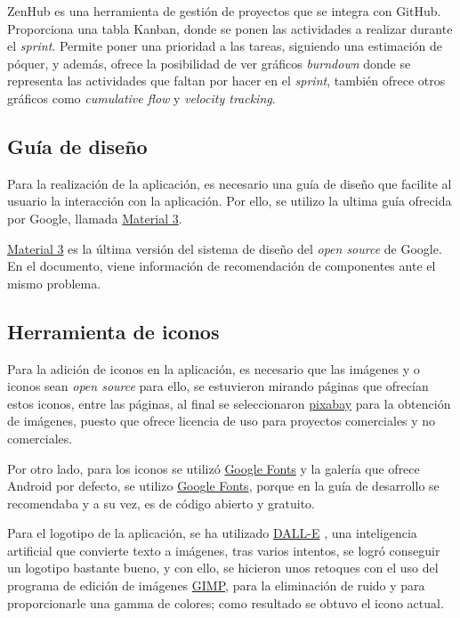         ZenHub es una herramienta de gestión de proyectos que se integra con GitHub. Proporciona una tabla Kanban, donde se ponen las actividades a realizar durante el \textit{sprint}. Permite poner una prioridad a las tareas, siguiendo una estimación de póquer, y además, ofrece la posibilidad de ver gráficos \textit{burndown} donde se representa las actividades que faltan por hacer en el \textit{sprint}, también ofrece otros gráficos como \textit{cumulative flow} y \textit{velocity tracking}.

    \subsection{Guía de diseño}
        Para la realización de la aplicación, es necesario una guía de diseño que facilite al usuario la interacción con la aplicación. Por ello, se utilizo la ultima guía ofrecida por Google, llamada \href{https://m3.material.io/}{Material 3}.

        \href{https://m3.material.io/}{Material 3} es la última versión del sistema de diseño del \textit{open source} de Google.
        En el documento, viene información de recomendación de componentes ante el mismo problema.

    \subsection{Herramienta de iconos}
        Para la adición de iconos en la aplicación, es necesario que las imágenes y o iconos sean \textit{open source} para ello, se estuvieron mirando páginas que ofrecían estos iconos, entre las páginas, al final se seleccionaron \href{https://pixabay.com/es/}{pixabay} para la obtención de imágenes, puesto que ofrece licencia de uso para proyectos comerciales y no comerciales.

        Por otro lado, para los iconos se utilizó \href{https://fonts.google.com/icons}{Google Fonts} y la galería que ofrece Android por defecto, se utilizo \href{https://fonts.google.com/icons}{Google Fonts}, porque en la guía de desarrollo se recomendaba y a su vez, es de código abierto y gratuito.

        Para el logotipo de la aplicación, se ha utilizado \href{https://labs.openai.com/}{DALL-E} , una inteligencia artificial que convierte texto a imágenes, tras varios intentos, se logró conseguir un logotipo bastante bueno, y con ello, se hicieron unos retoques con el uso del programa de edición de imágenes \href{https://www.gimp.org/}{GIMP}, para la eliminación de ruido y para proporcionarle una gamma de colores; como resultado se obtuvo el icono actual.

